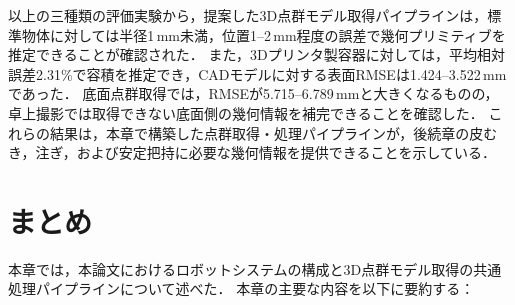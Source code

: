 以上の三種類の評価実験から，提案した3D点群モデル取得パイプラインは，標準物体に対しては半径1\,mm未満，位置1--2\,mm程度の誤差で幾何プリミティブを推定できることが確認された．
また，3Dプリンタ製容器に対しては，平均相対誤差2.31\%で容積を推定でき，CADモデルに対する表面RMSEは1.424--3.522\,mmであった．
底面点群取得では，RMSEが5.715--6.789\,mmと大きくなるものの，卓上撮影では取得できない底面側の幾何情報を補完できることを確認した．
これらの結果は，本章で構築した点群取得・処理パイプラインが，後続章の皮むき，注ぎ，および安定把持に必要な幾何情報を提供できることを示している．

\section{まとめ}
\label{sec:system:summary}

本章では，本論文におけるロボットシステムの構成と3D点群モデル取得の共通処理パイプラインについて述べた．
本章の主要な内容を以下に要約する：

